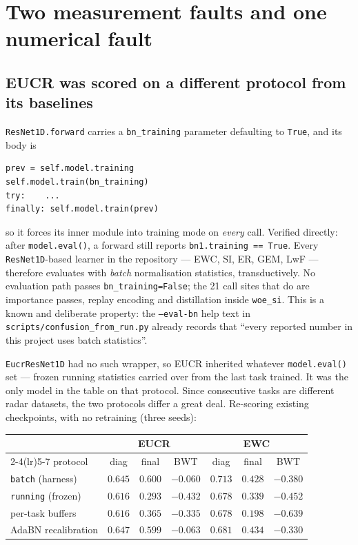 \documentclass{article}
\begin{document}
\section{Two measurement faults and one numerical fault}

\subsection{EUCR was scored on a different protocol from its baselines}
\label{sec:protocol}

\texttt{ResNet1D.forward} carries a \texttt{bn\_training} parameter defaulting to
\texttt{True}, and its body is

\begin{verbatim}
prev = self.model.training
self.model.train(bn_training)
try:    ...
finally: self.model.train(prev)
\end{verbatim}

so it forces its inner module into training mode on \emph{every} call. Verified
directly: after \texttt{model.eval()}, a forward still reports
\texttt{bn1.training == True}. Every \texttt{ResNet1D}-based learner in the
repository --- EWC, SI, ER, GEM, LwF --- therefore evaluates with \emph{batch}
normalisation statistics, transductively. No evaluation path passes
\texttt{bn\_training=False}; the 21 call sites that do are importance passes,
replay encoding and distillation inside \texttt{woe\_si}. This is a known and
deliberate property: the \texttt{--eval-bn} help text in
\texttt{scripts/confusion\_from\_run.py} already records that ``every reported
number in this project uses batch statistics''.

\texttt{EucrResNet1D} had no such wrapper, so EUCR inherited whatever
\texttt{model.eval()} set --- frozen running statistics carried over from the
last task trained. It was the only model in the table on that protocol. Since
consecutive tasks are different radar datasets, the two protocols differ a great
deal. Re-scoring existing checkpoints, with no retraining (three seeds):

\begin{center}
\begin{tabular}{lcccccc}
\toprule
 & \multicolumn{3}{c}{EUCR} & \multicolumn{3}{c}{EWC} \\
\cmidrule(lr){2-4}\cmidrule(lr){5-7}
protocol & diag & final & BWT & diag & final & BWT \\
\midrule
\texttt{batch} (harness) & $0.645$ & $\mathbf{0.600}$ & $-0.060$ & $0.713$ & $0.428$ & $-0.380$ \\
\texttt{running} (frozen) & $0.616$ & $0.293$ & $-0.432$ & $0.678$ & $0.339$ & $-0.452$ \\
per-task buffers          & $0.616$ & $0.365$ & $-0.335$ & $0.678$ & $0.198$ & $-0.639$ \\
AdaBN recalibration       & $0.647$ & $0.599$ & $-0.063$ & $0.681$ & $0.434$ & $-0.330$ \\
\bottomrule
\end{tabular}
\end{center}
\end{document}
